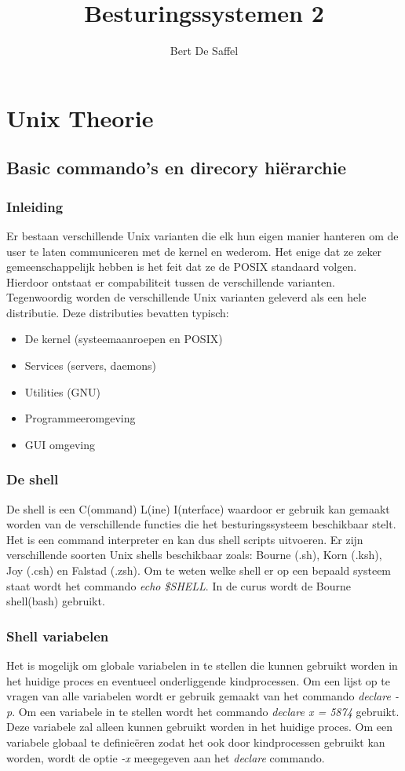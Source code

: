 \documentclass{report}
\title{Besturingssystemen 2}
\author{Bert De Saffel}
\begin{document}
\maketitle
\tableofcontents

\part{Unix Theorie}
\chapter{Basic commando's en direcory hiërarchie}
\section{Inleiding}
Er bestaan verschillende Unix varianten die elk hun eigen manier hanteren om de user te laten communiceren met de kernel en wederom. Het enige dat ze zeker gemeenschappelijk hebben is het feit dat ze de POSIX standaard volgen. Hierdoor ontstaat er compabiliteit tussen de verschillende varianten. Tegenwoordig worden de verschillende Unix varianten geleverd als een hele distributie. Deze distributies bevatten typisch:
\begin{itemize}
	\item De kernel (systeemaanroepen en POSIX)
	\item Services (servers, daemons)
	\item Utilities (GNU)
	\item Programmeeromgeving
	\item GUI omgeving
\end{itemize}

\section{De shell}
De shell is een C(ommand) L(ine) I(nterface) waardoor er gebruik kan gemaakt worden van de verschillende functies die het besturingssysteem beschikbaar stelt. Het is een command interpreter en kan dus shell scripts uitvoeren. Er zijn verschillende soorten Unix shells beschikbaar zoals: Bourne (.sh), Korn (.ksh), Joy (.csh) en Falstad (.zsh). Om te weten welke shell er op een bepaald systeem staat wordt het commando \textit{echo \$SHELL}. In de curus wordt de Bourne shell(bash) gebruikt.

\section{Shell variabelen}
Het is mogelijk om globale variabelen in te stellen die kunnen gebruikt worden in het huidige proces en eventueel onderliggende kindprocessen. Om een lijst op te vragen van alle variabelen wordt er gebruik gemaakt van het commando \textit{declare -p}. Om een variabele in te stellen wordt het commando \textit{declare x = 5874} gebruikt. Deze variabele zal alleen kunnen gebruikt worden in het huidige proces. Om een variabele globaal te definieëren zodat het ook door kindprocessen gebruikt kan worden, wordt de optie \textit{-x} meegegeven aan het \textit{declare} commando.
\end{document}
